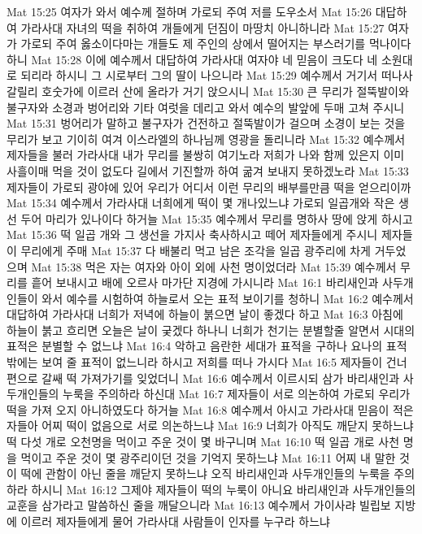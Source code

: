 Mat 15:25  여자가 와서 예수께 절하며 가로되 주여 저를 도우소서
Mat 15:26  대답하여 가라사대 자녀의 떡을 취하여 개들에게 던짐이 마땅치 아니하니라
Mat 15:27  여자가 가로되 주여 옳소이다마는 개들도 제 주인의 상에서 떨어지는 부스러기를 먹나이다 하니
Mat 15:28  이에 예수께서 대답하여 가라사대 여자야 네 믿음이 크도다 네 소원대로 되리라 하시니 그 시로부터 그의 딸이 나으니라
Mat 15:29  예수께서 거기서 떠나사 갈릴리 호숫가에 이르러 산에 올라가 거기 앉으시니
Mat 15:30  큰 무리가 절뚝발이와 불구자와 소경과 벙어리와 기타 여럿을 데리고 와서 예수의 발앞에 두매 고쳐 주시니
Mat 15:31  벙어리가 말하고 불구자가 건전하고 절뚝발이가 걸으며 소경이 보는 것을 무리가 보고 기이히 여겨 이스라엘의 하나님께 영광을 돌리니라
Mat 15:32  예수께서 제자들을 불러 가라사대 내가 무리를 불쌍히 여기노라 저희가 나와 함께 있은지 이미 사흘이매 먹을 것이 없도다 길에서 기진할까 하여 굶겨 보내지 못하겠노라
Mat 15:33  제자들이 가로되 광야에 있어 우리가 어디서 이런 무리의 배부를만큼 떡을 얻으리이까
Mat 15:34  예수께서 가라사대 너희에게 떡이 몇 개나있느냐 가로되 일곱개와 작은 생선 두어 마리가 있나이다 하거늘
Mat 15:35  예수께서 무리를 명하사 땅에 앉게 하시고
Mat 15:36  떡 일곱 개와 그 생선을 가지사 축사하시고 떼어 제자들에게 주시니 제자들이 무리에게 주매
Mat 15:37  다 배불리 먹고 남은 조각을 일곱 광주리에 차게 거두었으며
Mat 15:38  먹은 자는 여자와 아이 외에 사천 명이었더라
Mat 15:39  예수께서 무리를 흩어 보내시고 배에 오르사 마가단 지경에 가시니라
Mat 16:1  바리새인과 사두개인들이 와서 예수를 시험하여 하늘로서 오는 표적 보이기를 청하니
Mat 16:2  예수께서 대답하여 가라사대 너희가 저녁에 하늘이 붉으면 날이 좋겠다 하고
Mat 16:3  아침에 하늘이 붉고 흐리면 오늘은 날이 궂겠다 하나니 너희가 천기는 분별할줄 알면서 시대의 표적은 분별할 수 없느냐
Mat 16:4  악하고 음란한 세대가 표적을 구하나 요나의 표적 밖에는 보여 줄 표적이 없느니라 하시고 저희를 떠나 가시다
Mat 16:5  제자들이 건너편으로 갈쌔 떡 가져가기를 잊었더니
Mat 16:6  예수께서 이르시되 삼가 바리새인과 사두개인들의 누룩을 주의하라 하신대
Mat 16:7  제자들이 서로 의논하여 가로되 우리가 떡을 가져 오지 아니하였도다 하거늘
Mat 16:8  예수께서 아시고 가라사대 믿음이 적은 자들아 어찌 떡이 없음으로 서로 의논하느냐
Mat 16:9  너희가 아직도 깨닫지 못하느냐 떡 다섯 개로 오천명을 먹이고 주운 것이 몇 바구니며
Mat 16:10  떡 일곱 개로 사천 명을 먹이고 주운 것이 몇 광주리이던 것을 기억지 못하느냐
Mat 16:11  어찌 내 말한 것이 떡에 관함이 아닌 줄을 깨닫지 못하느냐 오직 바리새인과 사두개인들의 누룩을 주의하라 하시니
Mat 16:12  그제야 제자들이 떡의 누룩이 아니요 바리새인과 사두개인들의 교훈을 삼가라고 말씀하신 줄을 깨달으니라
Mat 16:13  예수께서 가이사랴 빌립보 지방에 이르러 제자들에게 물어 가라사대 사람들이 인자를 누구라 하느냐
